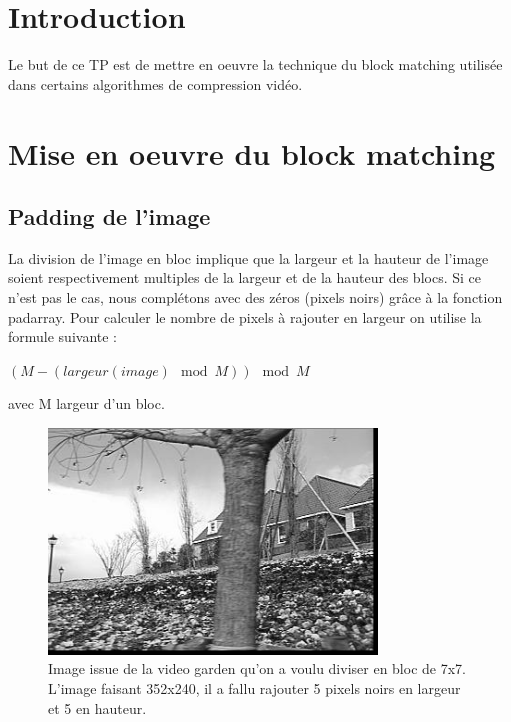\documentclass[a4paper, 12pt]{article}
\begin{document}






\clearpage

\section{Introduction}

Le but de ce TP est de mettre en oeuvre la technique du block matching utilisée dans certains algorithmes de compression vidéo.

\section{Mise en oeuvre du block matching}

\subsection{Padding de l'image}

La division de l'image en bloc implique que la largeur et la hauteur de l'image soient respectivement multiples de la largeur et de la hauteur des blocs. Si ce n'est pas le cas, nous complétons avec des zéros (pixels noirs) grâce à la fonction padarray. Pour calculer le nombre de pixels à rajouter en largeur on utilise la formule suivante : \\

\begin{center}
	$(M - (largeur(image) \mod M)) \mod M$ \\
\end{center}
avec M largeur d'un bloc.

\begin{figure}[H]
	\centering
		\includegraphics[height=6cm]{../garden_padding.jpg}
	\caption{Image issue de la video garden qu'on a voulu diviser en bloc de 7x7. L'image faisant 352x240, il a fallu rajouter 5 pixels noirs en largeur et 5 en hauteur.}
	\label{fig:padding}
\end{figure}
\end{document}

